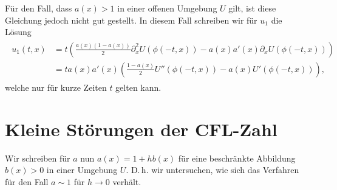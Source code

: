 Für den Fall, dass $a(x) > 1$ in einer offenen Umgebung $U$ gilt, ist diese Gleichung jedoch nicht gut gestellt.
In diesem Fall schreiben wir für $u_1$ die Lösung
\begin{align}
\begin{split}
u_1(t,x) &= t \left( \frac{a(x)(1 - a(x) )}{2} \partial^2_x U( \phi(-t, x) ) - a(x) a'(x)  \partial_x U( \phi(-t, x) )\right)\\
&= t a(x) a'(x) \left( \frac{1 - a(x) }{2} U''( \phi(-t, x) ) - a(x)  U'( \phi(-t, x) )\right),
\end{split}
\end{align}
welche nur für kurze Zeiten $t$ gelten kann.

\section{Kleine Störungen der CFL-Zahl}

Wir schreiben für $a$ nun $a(x) = 1 + h b(x)$ für eine beschränkte Abbildung $b(x) > 0$ in einer Umgebung $U$.
D.\,h. wir untersuchen, wie sich das Verfahren für den Fall $a  \sim 1$ für $h \to 0$ verhält.


